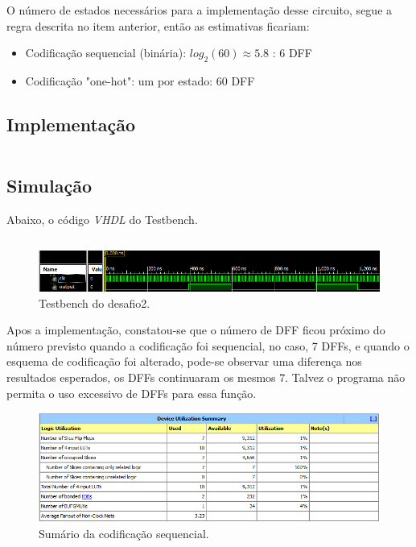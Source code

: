 \documentclass[12pt]{article}
\begin{document}
O número de estados necessários para a implementação desse circuito, segue a regra descrita no item anterior, então as estimativas ficariam: 

\begin{itemize}  
\item Codificação sequencial (binária): \begin{math}log_{2}(60)\approx 5.8\end{math} : 6 DFF
\item Codificação "one-hot": um por estado: 60 DFF
\end{itemize}


\subsection{Implementação}

\inputminted{vhdl}{desafio2.vhd}

\subsection{Simulação}

Abaixo, o código \emph{VHDL} do Testbench.

\inputminted{vhdl}{desafio2_tb.vhd}

\begin{figure}[!h]
    \centering
    \includegraphics[width=1.0\textwidth]{desafio2_tb.png}
    \caption{Testbench do desafio2.}
\end{figure}



Apos a implementação, constatou-se que o número de DFF ficou próximo do número previsto quando a codificação foi sequencial, no caso, 7 DFFs, e quando o esquema de codificação foi alterado, pode-se observar uma diferença nos resultados esperados, os DFFs continuaram os mesmos 7. Talvez o programa não permita o uso excessivo de DFFs para essa função.



\begin{figure}[!h]
    \centering
    \includegraphics[width=1.0\textwidth]{jesus.PNG}
    \caption{Sumário da codificação sequencial.}
\end{figure}
\end{document}
